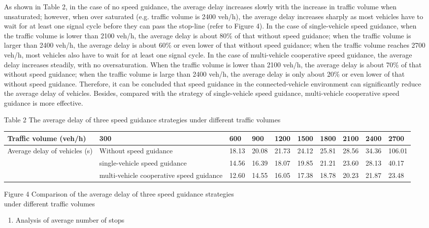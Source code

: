 As shown in Table 2, in the case of no speed guidance, the average delay
increases slowly with the increase in traffic volume when unsaturated;
however, when over saturated (e.g. traffic volume is 2400 veh/h), the
average delay increases sharply as most vehicles have to wait for at
least one signal cycle before they can pass the stop-line (refer to
Figure 4). In the case of single-vehicle speed guidance, when the
traffic volume is lower than 2100 veh/h, the average delay is about 80\%
of that without speed guidance; when the traffic volume is larger than
2400 veh/h, the average delay is about 60\% or even lower of that
without speed guidance; when the traffic volume reaches 2700 veh/h, most
vehicles also have to wait for at least one signal cycle. In the case of
multi-vehicle cooperative speed guidance, the average delay increases
steadily, with no oversaturation. When the traffic volume is lower than
2100 veh/h, the average delay is about 70\% of that without speed
guidance; when the traffic volume is large than 2400 veh/h, the average
delay is only about 20\% or even lower of that without speed guidance.
Therefore, it can be concluded that speed guidance in the
connected-vehicle environment can significantly reduce the average delay
of vehicles. Besides, compared with the strategy of single-vehicle speed
guidance, multi-vehicle cooperative speed guidance is more effective.

Table 2 The average delay of three speed guidance strategies under
different traffic volumes

\begin{longtable}[c]{@{}llllllllll@{}}
\toprule
Traffic volume (veh/h) & 300 & 600 & 900 & 1200 & 1500 & 1800 & 2100 &
2400 & 2700\tabularnewline
\midrule
\endhead
Average delay of vehicles (s) & Without speed guidance & 18.13 & 20.08 &
21.73 & 24.12 & 25.81 & 28.56 & 34.36 & 106.01\tabularnewline
& single-vehicle speed guidance & 14.56 & 16.39 & 18.07 & 19.85 & 21.21
& 23.60 & 28.13 & 40.17\tabularnewline
& multi-vehicle cooperative speed guidance & 12.60 & 14.55 & 16.05 &
17.38 & 18.78 & 20.23 & 21.87 & 23.48\tabularnewline
\bottomrule
\end{longtable}

Figure 4 Comparison of the average delay of three speed guidance
strategies\\
under different traffic volumes

\begin{enumerate}
\def\labelenumi{\arabic{enumi})}
\item
  Analysis of average number of stops
\end{enumerate}

